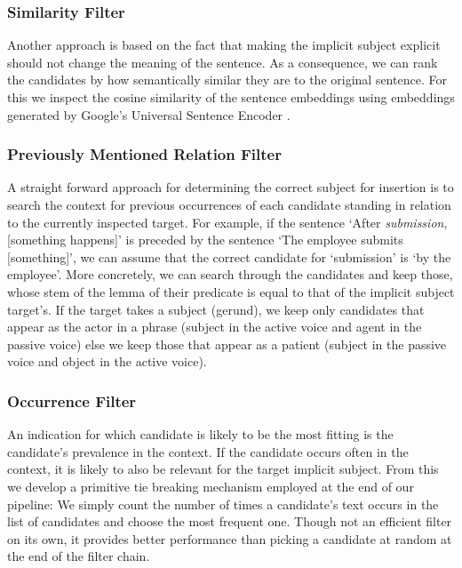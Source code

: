 \documentclass[times, 10pt,twocolumn]{article}
\begin{document}

\subsubsection{Similarity Filter}
Another approach is based on the fact that making the implicit subject explicit should not
change the meaning of the sentence. As a consequence, we can rank the candidates by how semantically
similar they are to the original sentence. For this we inspect the cosine similarity of the sentence
embeddings using embeddings generated by Google's Universal Sentence Encoder \cite{universal_sentence_encoder}.


\subsubsection{Previously Mentioned Relation Filter}
A straight forward approach for determining the correct subject for insertion is to search
the context for previous occurrences of each candidate standing in relation to the currently
inspected target. For example, if the sentence `After \textit{submission}, [something happens]'
is preceded by the sentence `The employee submits [something]', we can assume that the
correct candidate for `submission' is `by the employee'. More concretely, we can
search through the candidates and keep those, whose stem of the lemma of their predicate is equal to that
of the implicit subject target's. If the target takes a subject (gerund), we keep only
candidates that appear as the actor in a phrase (subject in the active voice and agent in the passive voice)
else we keep those that appear as a patient (subject in the passive voice and object in the active voice).


\subsubsection{Occurrence Filter}
An indication for which candidate is likely to be the most fitting is the candidate's prevalence in
the context. If the candidate occurs often in the context, it is likely to also be relevant for
the target implicit subject. From this we develop a primitive tie breaking mechanism employed at
the end of our pipeline: We simply count the number of times a candidate's text occurs in the
list of candidates and choose the most frequent one. Though not an efficient filter on its own,
it provides better performance than picking a candidate at random at the end of the filter chain.
\end{document}
